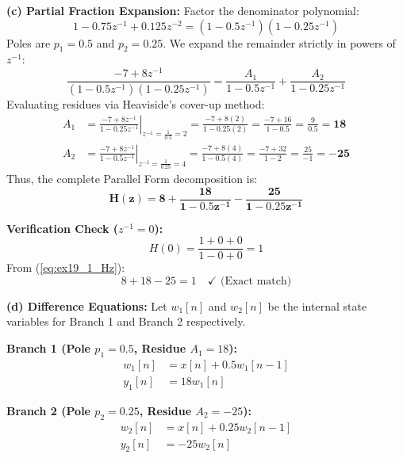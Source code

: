 \documentclass[11pt,a4paper]{article}
\begin{document}
\vspace{0.2cm}
\noindent\textbf{(c) Partial Fraction Expansion:}
Factor the denominator polynomial:
\begin{equation}
1 - 0.75 z^{-1} + 0.125 z^{-2} = (1 - 0.5 z^{-1})(1 - 0.25 z^{-1})
\end{equation}
Poles are $p_1 = 0.5$ and $p_2 = 0.25$.
We expand the remainder strictly in powers of $z^{-1}$:
\begin{equation}
\frac{-7 + 8 z^{-1}}{(1 - 0.5 z^{-1})(1 - 0.25 z^{-1})} = \frac{A_1}{1 - 0.5 z^{-1}} + \frac{A_2}{1 - 0.25 z^{-1}}
\end{equation}
Evaluating residues via Heaviside's cover-up method:
\begin{align}
A_1 &= \left. \frac{-7 + 8 z^{-1}}{1 - 0.25 z^{-1}} \right|_{z^{-1} = \frac{1}{0.5} = 2} = \frac{-7 + 8(2)}{1 - 0.25(2)} = \frac{-7 + 16}{1 - 0.5} = \frac{9}{0.5} = \mathbf{18} \\
A_2 &= \left. \frac{-7 + 8 z^{-1}}{1 - 0.5 z^{-1}} \right|_{z^{-1} = \frac{1}{0.25} = 4} = \frac{-7 + 8(4)}{1 - 0.5(4)} = \frac{-7 + 32}{1 - 2} = \frac{25}{-1} = \mathbf{-25}
\end{align}
Thus, the complete Parallel Form decomposition is:
\begin{equation}
\mathbf{H(z) = 8 + \frac{18}{1 - 0.5 z^{-1}} - \frac{25}{1 - 0.25 z^{-1}}}
\label{eq:ex19_1_Hz}
\end{equation}

\vspace{0.2cm}
\noindent\textbf{Verification Check ($z^{-1} = 0$):}
\begin{equation}
H(0) = \frac{1 + 0 + 0}{1 - 0 + 0} = 1
\end{equation}
From (\ref{eq:ex19_1_Hz}):
\begin{equation}
8 + 18 - 25 = 1 \quad \checkmark \text{ (Exact match)}
\end{equation}

\vspace{0.2cm}
\noindent\textbf{(d) Difference Equations:}
Let $w_1[n]$ and $w_2[n]$ be the internal state variables for Branch 1 and Branch 2 respectively.

\textbf{Branch 1 (Pole $p_1 = 0.5$, Residue $A_1 = 18$):}
\begin{align}
w_1[n] &= x[n] + 0.5 w_1[n-1] \\
y_1[n] &= 18 w_1[n]
\end{align}

\textbf{Branch 2 (Pole $p_2 = 0.25$, Residue $A_2 = -25$):}
\begin{align}
w_2[n] &= x[n] + 0.25 w_2[n-1] \\
y_2[n] &= -25 w_2[n]
\end{align}
\end{document}
